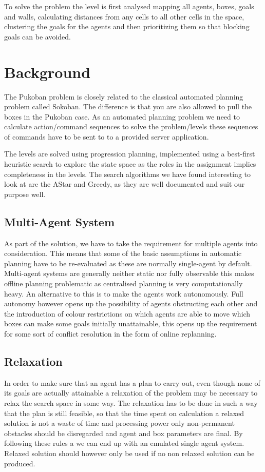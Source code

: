 \documentclass[letterpaper]{article}
\begin{document}
	To solve the problem the level is first analysed mapping all agents, boxes, goals and walls, calculating distances from any cells to all other cells in the space, clustering the goals for the agents and then prioritizing them so that blocking goals can be avoided.\\

\section{Background}
	The Pukoban problem is closely related to the classical automated planning problem called Sokoban. The difference is that you are also allowed to pull the boxes in the Pukoban case. As an automated planning problem we need to calculate action/command sequences to solve the problem/levels these sequences of commands have to be sent to to a provided server application.
	
	The levels are solved using progression planning, implemented using a best-first heuristic search to explore the state space as the roles in the assignment implies completeness in the levels. The search algorithms we have found interesting to look at are the AStar and Greedy, as they are well documented and suit our purpose well.
	\subsection{Multi-Agent System}
		As part of the solution, we have to take the requirement for multiple agents into consideration. This means that some of the basic assumptions in automatic planning have to be re-evaluated as these are normally single-agent by default.
		Multi-agent systems are generally neither static nor fully observable this makes offline planning problematic as centralised planning is very computationally heavy. An alternative to this is to make the agents work autonomously. Full autonomy  however opens up the possibility of agents obstructing each other and the introduction of colour restrictions on which agents are able to move which boxes can make some goals initially unattainable, this opens up the requirement for some sort of conflict resolution in the form of online replanning.
	\subsection{Relaxation}
		In order to make sure that an agent has a plan to carry out, even though none of its goals are actually attainable a relaxation of the problem may be necessary to relax the search space in some way. The relaxation has to be done in such a way that the plan is still feasible, so that the time spent on calculation a relaxed solution is not a waste of time and processing power only non-permanent obstacles should be disregarded and  agent and box parameters are final. By following these rules a we can end up with an emulated single agent system.
		Relaxed solution should however only be used if no non relaxed solution can be produced. 
\end{document}
